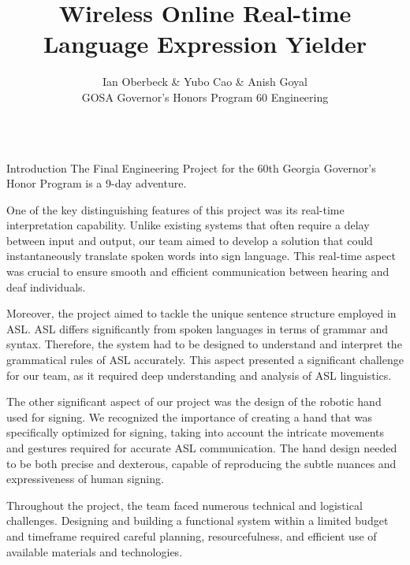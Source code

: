 \documentclass[final, 20pt]{beamer}
\title{Wireless Online Real-time Language Expression Yielder}
\author{Ian Oberbeck \& Yubo Cao \& Anish Goyal \\\normalfont GOSA Governor's Honors Program 60 Engineering}
\newlength{\colwidth}
\begin{document}
\begin{frame}[t]
\centering
\begin{columns}[t]
\margincolumn

\begin{column}{\colwidth}
  \begin{block}{Introduction}
    The Final Engineering Project for the 60th Georgia Governor's Honor Program is a 9-day adventure.


    One of the key distinguishing features of this project was its real-time interpretation capability. Unlike existing systems that often require a delay between input and output, our team aimed to develop a solution that could instantaneously translate spoken words into sign language. This real-time aspect was crucial to ensure smooth and efficient communication between hearing and deaf individuals.

    Moreover, the project aimed to tackle the unique sentence structure employed in ASL. ASL differs significantly from spoken languages in terms of grammar and syntax. Therefore, the system had to be designed to understand and interpret the grammatical rules of ASL accurately. This aspect presented a significant challenge for our team, as it required deep understanding and analysis of ASL linguistics.

    The other significant aspect of our project was the design of the robotic hand used for signing. We recognized the importance of creating a hand that was specifically optimized for signing, taking into account the intricate movements and gestures required for accurate ASL communication. The hand design needed to be both precise and dexterous, capable of reproducing the subtle nuances and expressiveness of human signing.

    Throughout the project, the team faced numerous technical and logistical challenges. Designing and building a functional system within a limited budget and timeframe required careful planning, resourcefulness, and efficient use of available materials and technologies.



\end{block}
\end{column}
\end{columns}
\end{frame}
\end{document}
